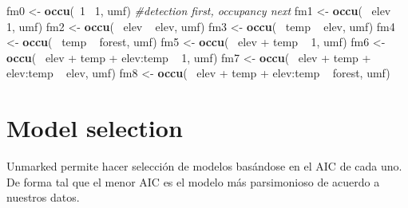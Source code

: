 \documentclass[]{book}
\newenvironment{Shaded}{\begin{snugshade}}{\end{snugshade}}
\newcommand{\KeywordTok}[1]{\textcolor[rgb]{0.13,0.29,0.53}{\textbf{{#1}}}}
\newcommand{\DecValTok}[1]{\textcolor[rgb]{0.00,0.00,0.81}{{#1}}}
\newcommand{\StringTok}[1]{\textcolor[rgb]{0.31,0.60,0.02}{{#1}}}
\newcommand{\CommentTok}[1]{\textcolor[rgb]{0.56,0.35,0.01}{\textit{{#1}}}}
\newcommand{\NormalTok}[1]{{#1}}
\begin{document}
\begin{Shaded}
\begin{Highlighting}[]
\NormalTok{fm0 <-}\StringTok{ }\KeywordTok{occu}\NormalTok{(~}\DecValTok{1} \NormalTok{~}\DecValTok{1}\NormalTok{, umf) }\CommentTok{#detection first, occupancy next}
\NormalTok{fm1 <-}\StringTok{ }\KeywordTok{occu}\NormalTok{(~}\StringTok{ }\NormalTok{elev ~}\StringTok{ }\DecValTok{1}\NormalTok{, umf)}
\NormalTok{fm2 <-}\StringTok{ }\KeywordTok{occu}\NormalTok{(~}\StringTok{ }\NormalTok{elev ~}\StringTok{ }\NormalTok{elev, umf)}
\NormalTok{fm3 <-}\StringTok{ }\KeywordTok{occu}\NormalTok{(~}\StringTok{ }\NormalTok{temp ~}\StringTok{ }\NormalTok{elev, umf)}
\NormalTok{fm4 <-}\StringTok{ }\KeywordTok{occu}\NormalTok{(~}\StringTok{ }\NormalTok{temp ~}\StringTok{ }\NormalTok{forest, umf)}
\NormalTok{fm5 <-}\StringTok{ }\KeywordTok{occu}\NormalTok{(~}\StringTok{ }\NormalTok{elev +}\StringTok{ }\NormalTok{temp ~}\StringTok{ }\DecValTok{1}\NormalTok{, umf)}
\NormalTok{fm6 <-}\StringTok{ }\KeywordTok{occu}\NormalTok{(~}\StringTok{ }\NormalTok{elev +}\StringTok{ }\NormalTok{temp +}\StringTok{ }\NormalTok{elev:temp ~}\StringTok{ }\DecValTok{1}\NormalTok{, umf)}
\NormalTok{fm7 <-}\StringTok{ }\KeywordTok{occu}\NormalTok{(~}\StringTok{ }\NormalTok{elev +}\StringTok{ }\NormalTok{temp +}\StringTok{ }\NormalTok{elev:temp ~}\StringTok{ }\NormalTok{elev, umf)}
\NormalTok{fm8 <-}\StringTok{ }\KeywordTok{occu}\NormalTok{(~}\StringTok{ }\NormalTok{elev +}\StringTok{ }\NormalTok{temp +}\StringTok{ }\NormalTok{elev:temp ~}\StringTok{ }\NormalTok{forest, umf)}
\end{Highlighting}
\end{Shaded}

\section{Model selection}\label{model-selection}

Unmarked permite hacer selección de modelos basándose en el AIC de cada
uno. De forma tal que el menor AIC es el modelo más parsimonioso de
acuerdo a nuestros datos.
\end{document}
